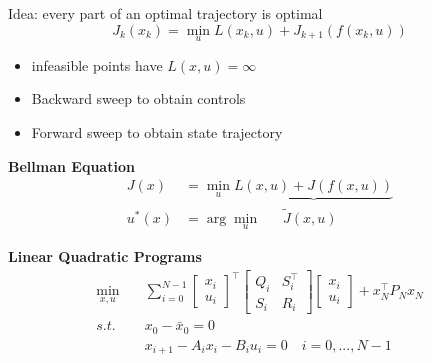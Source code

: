 
\begin{tcolorbox}[colback=yellow!5!white,colframe=yellow!75!black,title=\textbf{Dynamic Programming}]
	Idea: every part of an optimal trajectory is optimal
	\begin{equation*}
	J_k(x_k) = \min_u L(x_k, u) + J_{k+1}(f(x_k, u))
	\end{equation*}
	\begin{itemize}
		\item infeasible points have $L(x,u) = \infty$
		\item Backward sweep to obtain controls
		\item Forward sweep to obtain state trajectory\\
	\end{itemize}

	\textbf{Bellman Equation}
	\begin{align*}
		J(x) &= \min_u \underbrace{L(x,u) + J(f(x, u))}\\
		u^*(x) &= \arg \min_u \quad \;\; \tilde{J}(x, u)
	\end{align*}
	
	
	\textbf{Linear Quadratic Programs}
	\begin{align*}
		\min_{x,u}\quad&
		\sum_{i=0}^{N-1}
		\begin{bmatrix}
			x_i\\ u_i
		\end{bmatrix}^\top
		\begin{bmatrix}
			Q_i & S_i^\top\\ S_i & R_i
		\end{bmatrix}
	\begin{bmatrix}
		x_i\\ u_i
	\end{bmatrix}
	+
	x_N^\top P_N x_N\\
	s.t.\quad&
	x_0 - \bar{x}_0 = 0\\
	&x_{i+1} - A_i x_i - B_i u_i = 0 \quad i = 0, ..., N-1
	\end{align*}


\end{tcolorbox}
